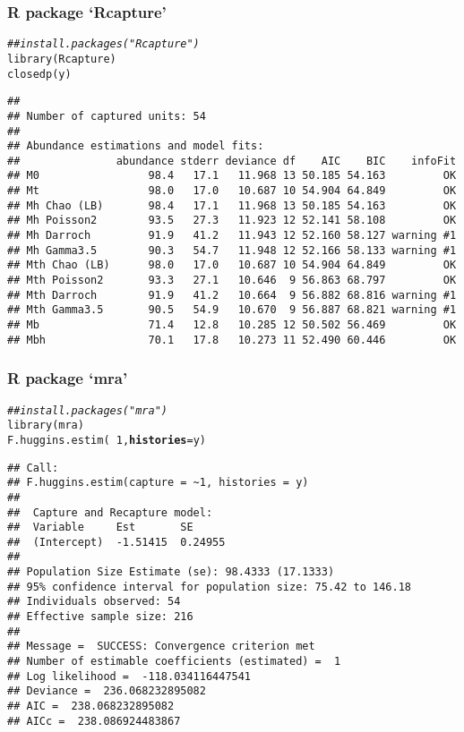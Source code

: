 \documentclass[color=usenames,dvipsnames]{beamer}\usepackage[]{graphicx}\usepackage[]{color}
\makeatletter
\newcommand{\hlnum}[1]{\textcolor[rgb]{0.69,0.494,0}{#1}}%
\newcommand{\hlcom}[1]{\textcolor[rgb]{0.514,0.506,0.514}{\textit{#1}}}%
\newcommand{\hlopt}[1]{\textcolor[rgb]{0,0,0}{#1}}%
\newcommand{\hlstd}[1]{\textcolor[rgb]{0,0,0}{#1}}%
\newcommand{\hlkwc}[1]{\textcolor[rgb]{0,0,0}{\textbf{#1}}}%
\newcommand{\hlkwd}[1]{\textcolor[rgb]{0.004,0.004,0.506}{#1}}%
\newenvironment{kframe}{%
 \def\at@end@of@kframe{}%
 \ifinner\ifhmode%
  \def\at@end@of@kframe{\end{minipage}}%
  \begin{minipage}{\columnwidth}%
 \fi\fi%
 \def\FrameCommand##1{\hskip\@totalleftmargin \hskip-\fboxsep
 \colorbox{shadecolor}{##1}\hskip-\fboxsep
     \hskip-\linewidth \hskip-\@totalleftmargin \hskip\columnwidth}%
 \MakeFramed {\advance\hsize-\width
   \@totalleftmargin\z@ \linewidth\hsize
   \@setminipage}}%
 {\par\unskip\endMakeFramed%
 \at@end@of@kframe}
\newenvironment{knitrout}{}{} %
\makeatother
\begin{document}
\begin{frame}[fragile]
  \frametitle{R package `Rcapture'}
\begin{knitrout}\scriptsize
{}\color{fgcolor}\begin{kframe}
\begin{alltt}
\hlcom{## install.packages("Rcapture")}
\hlkwd{library}\hlstd{(Rcapture)}
\hlkwd{closedp}\hlstd{(y)}
\end{alltt}
\begin{verbatim}
## 
## Number of captured units: 54 
## 
## Abundance estimations and model fits:
##               abundance stderr deviance df    AIC    BIC    infoFit
## M0                 98.4   17.1   11.968 13 50.185 54.163         OK
## Mt                 98.0   17.0   10.687 10 54.904 64.849         OK
## Mh Chao (LB)       98.4   17.1   11.968 13 50.185 54.163         OK
## Mh Poisson2        93.5   27.3   11.923 12 52.141 58.108         OK
## Mh Darroch         91.9   41.2   11.943 12 52.160 58.127 warning #1
## Mh Gamma3.5        90.3   54.7   11.948 12 52.166 58.133 warning #1
## Mth Chao (LB)      98.0   17.0   10.687 10 54.904 64.849         OK
## Mth Poisson2       93.3   27.1   10.646  9 56.863 68.797         OK
## Mth Darroch        91.9   41.2   10.664  9 56.882 68.816 warning #1
## Mth Gamma3.5       90.5   54.9   10.670  9 56.887 68.821 warning #1
## Mb                 71.4   12.8   10.285 12 50.502 56.469         OK
## Mbh                70.1   17.8   10.273 11 52.490 60.446         OK
\end{verbatim}
\end{kframe}
\end{knitrout}
\end{frame}




\begin{frame}[fragile]
  \frametitle{R package `mra'}
\begin{knitrout}\scriptsize
{}\color{fgcolor}\begin{kframe}
\begin{alltt}
\hlcom{## install.packages("mra")}
\hlkwd{library}\hlstd{(mra)}
\hlkwd{F.huggins.estim}\hlstd{(}\hlopt{~}\hlnum{1}\hlstd{,} \hlkwc{histories}\hlstd{=y)}
\end{alltt}
\begin{verbatim}
## Call:
## F.huggins.estim(capture = ~1, histories = y)
## 
##  Capture and Recapture model:
##  Variable     Est       SE     
##  (Intercept)  -1.51415  0.24955 
## 
## Population Size Estimate (se): 98.4333 (17.1333)
## 95% confidence interval for population size: 75.42 to 146.18
## Individuals observed: 54
## Effective sample size: 216
## 
## Message =  SUCCESS: Convergence criterion met
## Number of estimable coefficients (estimated) =  1
## Log likelihood =  -118.034116447541
## Deviance =  236.068232895082
## AIC =  238.068232895082
## AICc =  238.086924483867
\end{verbatim}
\end{kframe}
\end{knitrout}
\end{frame}
\end{document}
